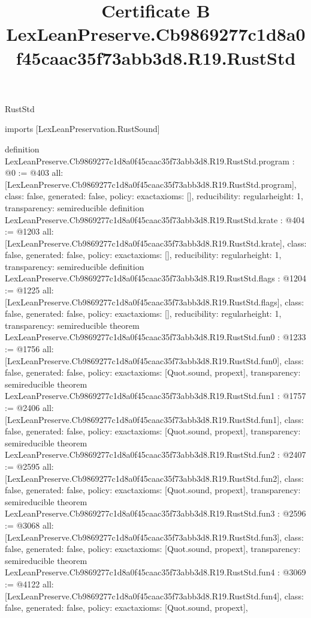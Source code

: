 \begin{lexlean}{RustStd}
\title{Certificate B LexLeanPreserve.Cb9869277c1d8a0f45caac35f73abb3d8.R19.RustStd}
\begin{coremodule}
imports [LexLeanPreservation.RustSound]

definition LexLeanPreserve.Cb9869277c1d8a0f45caac35f73abb3d8.R19.RustStd.program : @0 := @403 {
  all: [LexLeanPreserve.Cb9869277c1d8a0f45caac35f73abb3d8.R19.RustStd.program],
  class: false,
  generated: false,
  policy: exact{axioms: []},
  reducibility: regular{height: 1},
  transparency: semireducible
}
definition LexLeanPreserve.Cb9869277c1d8a0f45caac35f73abb3d8.R19.RustStd.krate : @404 := @1203 {
  all: [LexLeanPreserve.Cb9869277c1d8a0f45caac35f73abb3d8.R19.RustStd.krate],
  class: false,
  generated: false,
  policy: exact{axioms: []},
  reducibility: regular{height: 1},
  transparency: semireducible
}
definition LexLeanPreserve.Cb9869277c1d8a0f45caac35f73abb3d8.R19.RustStd.flags : @1204 := @1225 {
  all: [LexLeanPreserve.Cb9869277c1d8a0f45caac35f73abb3d8.R19.RustStd.flags],
  class: false,
  generated: false,
  policy: exact{axioms: []},
  reducibility: regular{height: 1},
  transparency: semireducible
}
theorem LexLeanPreserve.Cb9869277c1d8a0f45caac35f73abb3d8.R19.RustStd.fun0 : @1233 := @1756 {
  all: [LexLeanPreserve.Cb9869277c1d8a0f45caac35f73abb3d8.R19.RustStd.fun0],
  class: false,
  generated: false,
  policy: exact{axioms: [Quot.sound, propext]},
  transparency: semireducible
}
theorem LexLeanPreserve.Cb9869277c1d8a0f45caac35f73abb3d8.R19.RustStd.fun1 : @1757 := @2406 {
  all: [LexLeanPreserve.Cb9869277c1d8a0f45caac35f73abb3d8.R19.RustStd.fun1],
  class: false,
  generated: false,
  policy: exact{axioms: [Quot.sound, propext]},
  transparency: semireducible
}
theorem LexLeanPreserve.Cb9869277c1d8a0f45caac35f73abb3d8.R19.RustStd.fun2 : @2407 := @2595 {
  all: [LexLeanPreserve.Cb9869277c1d8a0f45caac35f73abb3d8.R19.RustStd.fun2],
  class: false,
  generated: false,
  policy: exact{axioms: [Quot.sound, propext]},
  transparency: semireducible
}
theorem LexLeanPreserve.Cb9869277c1d8a0f45caac35f73abb3d8.R19.RustStd.fun3 : @2596 := @3068 {
  all: [LexLeanPreserve.Cb9869277c1d8a0f45caac35f73abb3d8.R19.RustStd.fun3],
  class: false,
  generated: false,
  policy: exact{axioms: [Quot.sound, propext]},
  transparency: semireducible
}
theorem LexLeanPreserve.Cb9869277c1d8a0f45caac35f73abb3d8.R19.RustStd.fun4 : @3069 := @4122 {
  all: [LexLeanPreserve.Cb9869277c1d8a0f45caac35f73abb3d8.R19.RustStd.fun4],
  class: false,
  generated: false,
  policy: exact{axioms: [Quot.sound, propext]},
}
\end{coremodule}
\end{lexlean}
